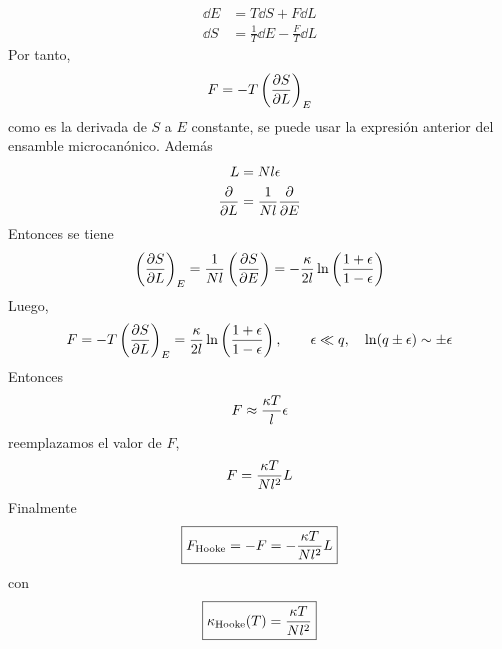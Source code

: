 \begin{align}
  \dd E&=T\dd S+F\dd L\\
  \dd S&=\frac{1}{T}\dd E-\frac{F}{T}\dd L
\end{align}
Por tanto, \begin{equation}
  F=-T\left(\pdv{S}{L}\right)_E
\end{equation}
como es la derivada de $S$ a $E$ constante, se puede usar la expresión anterior del ensamble microcanónico. Además
\begin{align}
  L&=Nl\epsilon\\
  \pdv{L}&=\frac{1}{Nl}\pdv{E}
\end{align}
Entonces se tiene
\begin{equation}
  \left(\pdv{S}{L}\right)_E=\frac{1}{Nl}\left(\pdv{S}{E}\right)=-\frac{\kappa }{2l}\ln\left(\frac{1+\epsilon}{1-\epsilon}\right)
\end{equation}
Luego,
\begin{equation}
  F=-T\left(\pdv{S}{L}\right)_E=\frac{\kappa }{2l}\ln\left(\frac{1+\epsilon}{1-\epsilon}\right),\qquad \epsilon\ll q,\quad \ln(q\pm \epsilon)\sim \pm \epsilon
\end{equation}
Entonces
\begin{equation}
  F\approx \frac{\kappa T}{l}\epsilon
\end{equation}
reemplazamos el valor de $F$,
\begin{equation}
  F=\frac{\kappa T}{N l^2}L
\end{equation}
Finalmente
\begin{equation}
\boxed{  F_{\rm Hooke}=-F=-\frac{\kappa T}{Nl^2}L}
\end{equation}
con
\begin{equation}
\boxed{  \kappa_{\rm Hooke}(T)=\frac{\kappa T}{Nl^2}}
\end{equation}




















































